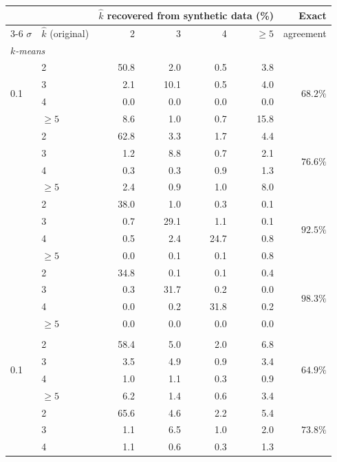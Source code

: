 \begin{tabular}{llrrrrr}
\toprule
 & & \multicolumn{4}{c}{$\hat{k}$ recovered from synthetic data (\%)} & Exact \\
\cmidrule(lr){3-6}
$\sigma$ & $\hat{k}$ (original) & 2 & 3 & 4 & $\geq 5$ & agreement \\
\midrule
\multicolumn{7}{l}{\textit{$k$-means}} \\
\multirow{4}{*}{0.1} & 2 & 50.8 & 2.0 & 0.5 & 3.8 & \multirow{4}{*}{$68.2\%$} \\
 & 3 & 2.1 & 10.1 & 0.5 & 4.0 &  \\
 & 4 & 0.0 & 0.0 & 0.0 & 0.0 &  \\
 & $\geq 5$ & 8.6 & 1.0 & 0.7 & 15.8 &  \\
\addlinespace
\multirow{4}{*}{2} & 2 & 62.8 & 3.3 & 1.7 & 4.4 & \multirow{4}{*}{$76.6\%$} \\
 & 3 & 1.2 & 8.8 & 0.7 & 2.1 &  \\
 & 4 & 0.3 & 0.3 & 0.9 & 1.3 &  \\
 & $\geq 5$ & 2.4 & 0.9 & 1.0 & 8.0 &  \\
\addlinespace
\multirow{4}{*}{6} & 2 & 38.0 & 1.0 & 0.3 & 0.1 & \multirow{4}{*}{$92.5\%$} \\
 & 3 & 0.7 & 29.1 & 1.1 & 0.1 &  \\
 & 4 & 0.5 & 2.4 & 24.7 & 0.8 &  \\
 & $\geq 5$ & 0.0 & 0.1 & 0.1 & 0.8 &  \\
\addlinespace
\multirow{4}{*}{10} & 2 & 34.8 & 0.1 & 0.1 & 0.4 & \multirow{4}{*}{$98.3\%$} \\
 & 3 & 0.3 & 31.7 & 0.2 & 0.0 &  \\
 & 4 & 0.0 & 0.2 & 31.8 & 0.2 &  \\
 & $\geq 5$ & 0.0 & 0.0 & 0.0 & 0.0 &  \\
\addlinespace
\midrule
\multicolumn{7}{l}{\textit{Ward}} \\
\multirow{4}{*}{0.1} & 2 & 58.4 & 5.0 & 2.0 & 6.8 & \multirow{4}{*}{$64.9\%$} \\
 & 3 & 3.5 & 4.9 & 0.9 & 3.4 &  \\
 & 4 & 1.0 & 1.1 & 0.3 & 0.9 &  \\
 & $\geq 5$ & 6.2 & 1.4 & 0.6 & 3.4 &  \\
\addlinespace
\multirow{4}{*}{2} & 2 & 65.6 & 4.6 & 2.2 & 5.4 & \multirow{4}{*}{$73.8\%$} \\
 & 3 & 1.1 & 6.5 & 1.0 & 2.0 &  \\
 & 4 & 1.1 & 0.6 & 0.3 & 1.3 &  \\

\end{tabular}
